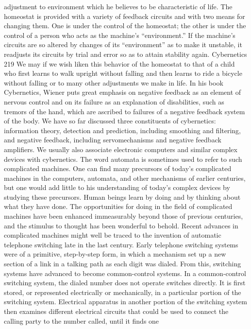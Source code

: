 {{{{{{{{{{{adjustment to environment which he believes to be characteristic
of life. The homeostat is provided with a variety of feedback
circuits and with two means for changing them. One is under the
control of the homeostat; the other is under the control of a person
who acts as the machine’s “environment.” If the machine’s circuits
are so altered by changes of its “environment” as to make it
unstable, it readjusts its circuits by trial and error so as to attain
stability again.
Cybernetics
219
We may if we wish liken this behavior of the homeostat to that
of a child who first learns to walk upright without falling and then
learns to ride a bicycle without falling or to many other adjustments
we make in life. In his book Cybernetics, Wiener puts great
emphasis on negative feedback as an element of nervous control
and on its failure as an explanation of disabilities, such as tremors
of the hand, which are ascribed to failures of a negative feedback
system of the body.
We have so far discussed three constituents of cybernetics:
information theory, detection and prediction, including smoothing
and filtering, and negative feedback, including servomechanisms
and negative feedback amplifiers. We usually also associate electronic
computers and similar complex devices with cybernetics.
The word automata is sometimes used to refer to such complicated
machines.
One can find many precursors of today’s complicated machines
in the computers, automata, and other mechanisms of earlier
centuries, but one would add little to his understanding of today’s
complex devices by studying these precursors. Human beings learn
by doing and by thinking about what they have done. The opportunities
for doing in the field of complicated machines have been
enhanced immeasurably beyond those of previous centuries, and
the stimulus to thought has been wonderful to behold.
Recent advances in complicated machines might well be traced
to the invention of automatic telephone switching late in the last
century. Early telephone switching systems were of a primitive,
step-by-step form, in which a mechanism set up a new section of
a link in a talking path as each digit was dialed. From this, switching
systems have advanced to become common-control systems. In
a common-control switching system, the dialed number does not
operate switches directly. It is first stored, or represented electrically
or mechanically, in a particular portion of the switching
system. Electrical apparatus in another portion of the switching
system then examines different electrical circuits that could be used
to connect the calling party to the number called, until it finds one
}}}}}}}}}}}
